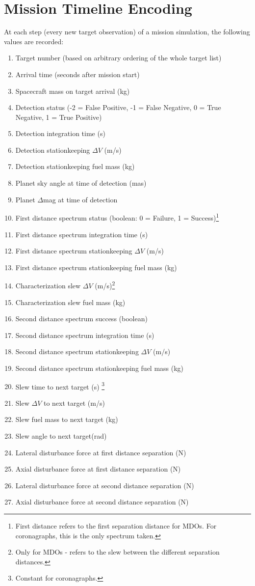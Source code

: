 \chapter{Mission Timeline Encoding}\label{app:DRMencoding}

At each step (every new target observation) of a mission simulation, the following values are recorded:

\begin{enumerate}
\item Target number (based on arbitrary ordering of the whole target list)
\item Arrival time (seconds after mission start)
\item Spacecraft mass on target arrival (kg)
\item Detection status (-2 = False Positive, -1 = False Negative, 0 = True Negative, 1 = True Positive)
\item Detection integration time (s)
\item Detection stationkeeping $\Delta V$ (m/s) 
\item Detection stationkeeping fuel mass (kg)
\item Planet sky angle at time of detection (mas)
\item Planet $\Delta$mag at time of detection
\item First distance spectrum status (boolean: 0 = Failure, 1 = Success)\footnote{First distance refers to the first separation distance for MDOs.  For coronagraphs, this is the only spectrum taken.}
\item First distance spectrum integration time (s)
\item First distance spectrum stationkeeping $\Delta V$  (m/s)
\item First distance spectrum stationkeeping fuel mass (kg)
\item Characterization slew $\Delta V$ (m/s)\footnote{Only for MDOs - refers to the slew between the different separation distances.}
\item Characterization slew fuel mass (kg)
\item Second distance spectrum success (boolean)
\item Second distance spectrum integration time (s)
\item Second distance spectrum stationkeeping $\Delta V$ (m/s)
\item Second distance spectrum stationkeeping fuel mass (kg)
\item Slew time to next target (s) \footnote{Constant for coronagraphs.}
\item Slew $\Delta V$ to next target (m/s)
\item Slew fuel mass to next target (kg)
\item Slew angle to next target(rad)
\item Lateral disturbance force at first distance separation (N)
\item Axial disturbance force at first distance separation (N)
\item Lateral disturbance force at second distance separation (N)
\item Axial disturbance force at second distance separation (N)
\end{enumerate}